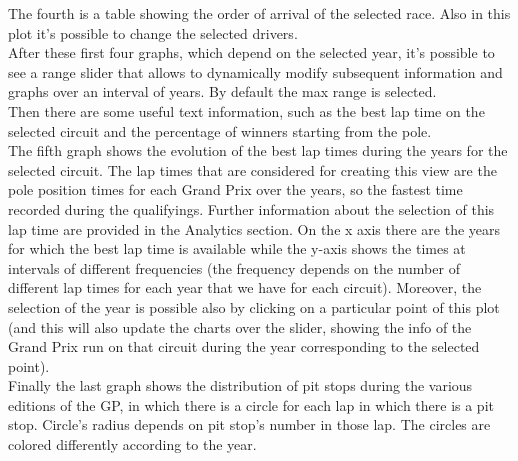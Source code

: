 \documentclass[11pt,twocolumn,letterpaper]{article}
\begin{document}
The fourth is a table showing the order of arrival of the selected race. Also in this plot it's possible to change the selected drivers.\\
After these first four graphs, which depend on the selected year, it's possible to see a range slider that allows to dynamically modify subsequent information and graphs over an interval of years. By default the max range is selected. \\
Then there are some useful text information, such as the best lap time on the selected circuit and the percentage of winners starting from the pole. \\
The fifth graph shows the evolution of the best lap times during the years for the selected circuit. The lap times that are considered for creating this view are the pole position times for each Grand Prix over the years, so the fastest time recorded during the qualifyings. Further information about the selection of this lap time are provided in the Analytics section. On the x axis there are the years for which the best lap time is available while the y-axis shows the times at intervals of different frequencies (the frequency depends on the number of different lap times for each year that we have for each circuit). Moreover, the selection of the year is possible also by clicking on a particular point of this plot (and this will also update the charts over the slider, showing the info of the Grand Prix run on that circuit during the year corresponding to the selected point).\\
Finally the last graph shows the distribution of pit stops during the various editions of the GP, in which there is a circle for each lap in which there is a pit stop. Circle's radius depends on pit stop's number in those lap. The circles are colored differently according to the year.
\end{document}
